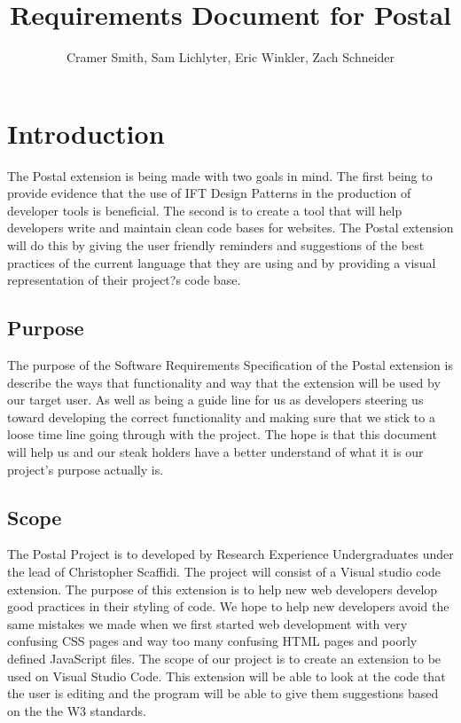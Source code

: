 \documentclass[letterpaper,10pt,titlepage,draftclsnofoot,onecolumn,onesided] {IEEEtran}
\begin{document}

\title{\Huge{\bfseries{\textsf{Requirements Document for Postal}}}}
\author{Cramer Smith, Sam Lichlyter, Eric Winkler, Zach Schneider}

\maketitle

\pagebreak

\tableofcontents

\pagebreak

\section{Introduction}

The Postal extension is being made with two goals in mind. The first being to provide evidence that the use of IFT Design Patterns in the production of developer tools is beneficial. The second is to create a tool that will help developers write and maintain clean code bases for websites.
The Postal extension will do this by giving the user friendly reminders and suggestions of the best practices of the current language that they are using and by providing a visual representation of their project?s code base.

\subsection{Purpose}
The purpose of the Software Requirements Specification of the Postal extension is describe the ways that functionality and way that the extension will be used by our target user. 
As well as being a guide line for us as developers steering us toward developing the correct functionality and making sure that we stick to a loose time line going through with the project.
The hope is that this document will help us and our steak holders have a better understand of what it is our project's purpose actually is.

\subsection{Scope}
The Postal Project is to developed by Research Experience Undergraduates under the lead of Christopher Scaffidi. 
The project will consist of a Visual studio code extension.
The purpose of this extension is to help new web developers develop good practices in their styling of code.
We hope to help new developers avoid the same mistakes we made when we first started web development with very confusing CSS pages and way too many confusing HTML pages and poorly defined JavaScript files.
The scope of our project is to create an extension to be used on Visual Studio Code. 
This extension will be able to look at the code that the user is editing and the program will be able to give them suggestions based on the the W3 standards. 
\end{document}
